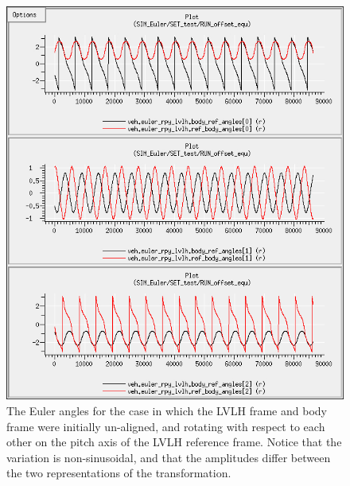 \begin{description}
\begin{figure}[!ht]
\begin{center}
\includegraphics[width=5in]{figures/euler_nonaligned_rpy.jpg}
\caption{The Euler angles for the case in which the LVLH frame and body frame were initially un-aligned, and rotating with respect to each other on the pitch axis of the LVLH reference frame.  Notice that the variation is non-sinusoidal, and that the amplitudes differ between the two representations of the transformation.}
\label{fig:eulernonalignedrpy}
\end{center}
\end{figure}




\end{description}
